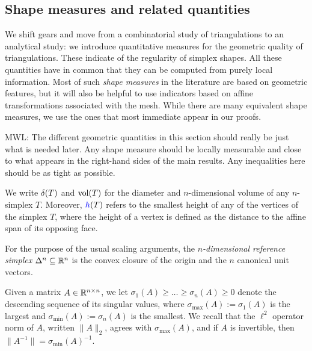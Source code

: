 \documentclass[10pt,a4paper]{article}
\newcommand{\mwl}[1]{{\color{red}#1}}
\begin{document}
\subsection{Shape measures and related quantities}

We shift gears and move from a combinatorial study of triangulations to an analytical study:
we introduce quantitative measures for the geometric quality of triangulations. 
These indicate of the regularity of simplex shapes. 
All these quantities have in common that they can be computed from purely local information. 
Most of such \emph{shape measures} in the literature are based on geometric features, 
but it will also be helpful to use indicators based on affine transformations associated with the mesh. %
While there are many equivalent shape measures, we use the ones that most immediate appear in our proofs.

\mwl{MWL: The different geometric quantities in this section should really be just what is needed later. Any shape measure should be locally measurable and close to what appears in the right-hand sides of the main results. Any inequalities here should be as tight as possible. }

We write ${\delta}(T)$ and $\operatorname{vol}(T)$ for the diameter and $n$-dimensional volume of any $n$-simplex $T$.
Moreover, $\height(T)$ refers to the smallest height of any of the vertices of the simplex $T$,
where the height of a vertex is defined as the distance to the affine span of its opposing face.

For the purpose of the usual scaling arguments, the \emph{$n$-dimensional reference simplex} $\Delta^n \subseteq {\mathbb R}^n$ is the convex closure of the origin and the $n$ canonical unit vectors. 

Given a matrix $A \in {\mathbb R}^{n \times n}$, we let $\sigma_{1}(A) \geq \dots \geq \sigma_{n}(A) \geq 0$ denote the descending sequence of its singular values, 
where $\sigma_{\max}(A) := \sigma_{1}(A)$ is the largest and $\sigma_{\min}(A) := \sigma_{n}(A)$ is the smallest. 
We recall that the $\ell^{2}$ operator norm of $A$, written $\| A \|_{2}$, agrees with $\sigma_{\max}(A)$,
and if $A$ is invertible, then $\|A^{-1}\| = \sigma_{\min}(A)^{-1}$.
\end{document}
